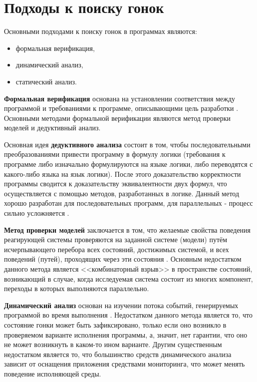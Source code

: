 \chapter{Подходы к поиску гонок}
\label{cha:methods}

Основными подходами к поиску гонок в программах являются:
\begin{itemize}
\item формальная верификация,
\item динамический анализ,
\item статический анализ.
\end{itemize}

\textbf{Формальная верификация} основана на установлении соответствия между программой и требованиями к программе, описывающими цель разработки \cite{kropacheva-formal-verification}. Основными методами формальной верификации являются метод проверки моделей и дедуктивный анализ.

Основная идея \textbf{дедуктивного анализа} состоит в том, чтобы последовательными преобразованиями привести программу в формулу логики (требования к программе либо изначально формулируются на языке логики, либо переводятся с какого-либо языка на язык логики). После этого доказательство корректности программы сводится к доказательству эквивалентности двух формул, что осуществляется с помощью методов, разработанных в логике. Данный метод хорошо разработан для последовательных программ, для параллельных - процесс сильно усложняется \cite{kropacheva-formal-verification}.

\textbf{Метод проверки моделей} заключается в том, что желаемые свойства поведения реагирующей системы проверяются на заданной системе (модели) путём исчерпывающего перебора всех состояний, достижимых системой, и всех поведений (путей), проходящих через эти состояния \cite{klark-model-checking}. Основным недостатком данного метода является <<комбинаторный взрыв>> в пространстве состояний, возникающий в случае, когда исследуемая система состоит из многих компонент, переходы в которых выполняются параллельно.

\textbf{Динамический анализ} основан на изучении потока событий, генерируемых программой во время выполнения \cite{kovega-dynamic-analysis}. Недостатком данного метода является то, что состояние гонки может быть зафиксировано, только если оно возникло в проверяемом варианте исполнения программы, а, значит, нет гарантии, что оно не может возникнуть в каком-то ином варианте. Другим существенным недостатком является то, что большинство средств динамического анализа зависит от оснащения приложения средствами мониторинга, что может менять поведение исполняющей среды.

